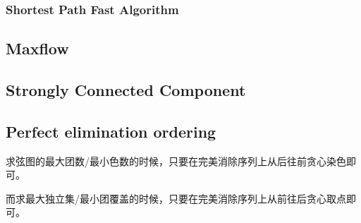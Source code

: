 \subsubsection{Shortest Path Fast Algorithm}


\subsection{Maxflow}


\subsection{Strongly Connected Component}


\subsection{Perfect elimination ordering}
求弦图的最大团数/最小色数的时候，只要在完美消除序列上从后往前贪心染色即可。
 
而求最大独立集/最小团覆盖的时候，只要在完美消除序列上从前往后贪心取点即可。

